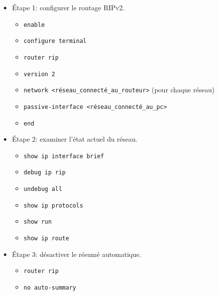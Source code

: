 \documentclass[a4paper]{article}
\begin{document}
\begin{itemize}





\item Étape 1: configurer le routage RIPv2.
\begin{example}
    \begin{itemize}
        \item \texttt{enable}
        \item \texttt{configure terminal}
        \item \texttt{router rip}
        \item \texttt{version 2}
        \item \texttt{network <réseau\_connecté\_au\_routeur>} \qquad (pour chaque réseau)
        \item \texttt{passive-interface <réseau\_connecté\_au\_pc>}
        \item \texttt{end}
    \end{itemize}
\end{example}





\item Étape 2: examiner l'état actuel du réseau.
\begin{example}
    \begin{itemize}
            \item \texttt{show ip interface brief}
            \item \texttt{debug ip rip}
            \item \texttt{undebug all}
            \item \texttt{show ip protocols}
            \item \texttt{show run}
            \item \texttt{show ip route}
        \end{itemize}
\end{example}





\item Étape 3: désactiver le résumé automatique.
\begin{example}
    \begin{itemize}
        \item \texttt{router rip}
        \item \texttt{no auto-summary}
    \end{itemize}
\end{example}






\end{itemize}
\end{document}
